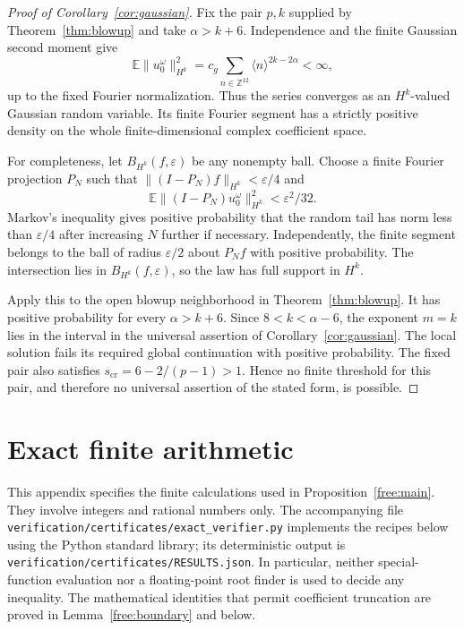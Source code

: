 \documentclass[11pt]{article}
\numberwithin{equation}{section}
\theoremstyle{definition}
\theoremstyle{remark}
\begin{document}
\begin{proof}[Proof of Corollary~\ref{cor:gaussian}]
Fix the pair $p,k$ supplied by Theorem~\ref{thm:blowup} and take
$\alpha>k+6$. Independence and the finite Gaussian second moment give
\[
 \mathbb E\|u_0^\omega\|_{H^k}^2
 =c_g\sum_{n\in\mathbb Z^{12}}\langle n\rangle^{2k-2\alpha}<\infty,
\]
up to the fixed Fourier normalization. Thus the series converges as an
$H^k$-valued Gaussian random variable. Its finite Fourier segment has a
strictly positive density on the whole finite-dimensional complex
coefficient space.

For completeness, let $B_{H^k}(f,\varepsilon)$ be any nonempty ball.
Choose a finite Fourier projection $P_N$ such that
$\|(I-P_N)f\|_{H^k}<\varepsilon/4$ and
\[
 \mathbb E\|(I-P_N)u_0^\omega\|_{H^k}^2<\varepsilon^2/32.
\]
Markov's inequality gives positive probability that the random tail
has norm less than $\varepsilon/4$ after increasing $N$ further if
necessary. Independently, the finite segment belongs to the ball of
radius $\varepsilon/2$ about $P_Nf$ with positive probability.
The intersection lies in $B_{H^k}(f,\varepsilon)$, so the law has full
support in $H^k$.

Apply this to the open blowup neighborhood in Theorem~\ref{thm:blowup}.
It has positive probability for every $\alpha>k+6$. Since
$8<k<\alpha-6$, the exponent $m=k$ lies in the interval in the universal assertion of
Corollary~\ref{cor:gaussian}. The local solution fails its required global continuation
with positive probability. The fixed pair also satisfies
$s_{\mathrm{cr}}=6-2/(p-1)>1$. Hence no finite threshold for this pair,
and therefore no universal assertion of the stated form, is possible.
\end{proof}


\appendix
\section{Exact finite arithmetic}\label{cert:arithmetic}

This appendix specifies the finite calculations used in
Proposition~\ref{free:main}.  They involve integers and rational numbers
only.  The accompanying file
\texttt{verification/}\allowbreak\texttt{certificates/}\allowbreak\texttt{exact\_verifier.py}
implements the recipes below using the Python standard library; its
deterministic output is
\texttt{verification/}\allowbreak\texttt{certificates/}\allowbreak\texttt{RESULTS.json}.  In particular,
neither special-function evaluation nor a floating-point root finder is
used to decide any inequality.  The mathematical identities that permit
coefficient truncation are proved in Lemma~\ref{free:boundary} and below.
\end{document}
